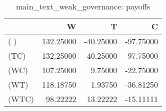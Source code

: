 \begin{table}
\centering
\caption{main_text_weak_governance: payoffs}
\begin{tabular}{lrrr}
\toprule
{} &         W &         T &         C \\
\midrule
( )   & 132.25000 & -40.25000 & -97.75000 \\
(TC)  & 132.25000 & -40.25000 & -97.75000 \\
(WC)  & 107.25000 &   9.75000 & -22.75000 \\
(WT)  & 118.18750 &   1.93750 & -36.81250 \\
(WTC) &  98.22222 &  13.22222 & -15.11111 \\
\bottomrule
\end{tabular}
\end{table}
